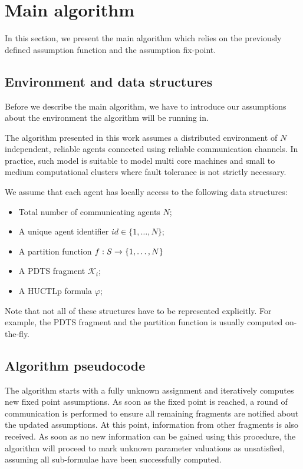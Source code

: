 \section{Main algorithm}

In this section, we present the main algorithm which relies on the previously defined assumption function and the assumption fix-point.

\subsection{Environment and data structures}

Before we describe the main algorithm, we have to introduce our assumptions about the environment the algorithm will be running in.

The algorithm presented in this work assumes a distributed environment of $N$ independent, reliable agents connected using reliable communication channels. In practice, such model is suitable to model multi core machines and small to medium computational clusters where fault tolerance is not strictly necessary.

We assume that each agent has locally access to the following data structures:

\begin{itemize}
	\item Total number of communicating agents $N$;
	\item A unique agent identifier $id \in \{ 1, \ldots, N \}$;
	\item A partition function $f : \mathit{S} \to \{1, \ldots, N \}$
	\item A \ac{PDTS} fragment $\mathcal{K}_i$;
	\item A \ac{HUCTLp} formula $\varphi$;
\end{itemize}

Note that not all of these structures have to be represented explicitly. For example, the \ac{PDTS} fragment and the partition function is usually computed on-the-fly.

\subsection{Algorithm pseudocode}

The algorithm starts with a fully unknown assignment and iteratively computes new fixed point assumptions. As soon as the fixed point is reached, a round of communication is performed to ensure all remaining fragments are notified about the updated assumptions. At this point, information from other fragments is also received. As soon as no new information can be gained using this procedure, the algorithm will proceed to mark unknown parameter valuations as unsatisfied, assuming all sub-formulae have been successfully computed.

